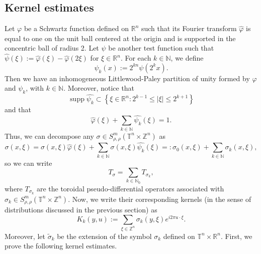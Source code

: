 \documentclass[12pt, reqno]{amsart}
\theoremstyle{definition}
\theoremstyle{remark}
\numberwithin{equation}{section}
\DeclareMathOperator{\supp}{supp}
\begin{document}
\subsection{Kernel estimates}
\label{ssection:kernel}
Let $\varphi$ be a Schwartz function defined on $\mathbb{R}^n$ such that its Fourier transform $\widehat{\varphi}$ is equal to one on the unit ball centered at the origin and is supported in the concentric ball of radius 2. Let $\psi$ be another test function such that $\widehat{\psi}(\xi) := \widehat{\varphi}(\xi) - \widehat{\varphi}(2\xi)$ for $\xi \in \mathbb{R}^n$. For each $k \in \mathbb{N}$, we define
\begin{equation*}
    \psi_k(x):=2^{kn}\psi(2^kx).
\end{equation*}
Then we have an inhomogeneous Littlewood-Paley partition of unity formed by $\varphi$ and $\psi_k$, with $k\in\mathbb{N}$. Moreover, notice that 
\begin{equation*}
    \supp \widehat{\psi_k} \subset \left\{\xi \in \mathbb{R}^n : 2^{k-1} \leq |\xi|\leq 2^{k+1}\right\}
\end{equation*}
and that
\begin{equation*}
    \widehat{\varphi}(\xi) + \sum_{k\in\mathbb{N}} \widehat{\psi_k}(\xi) = 1.
\end{equation*}
Thus, we can decompose any $\sigma \in S^m_{\rho,\rho}(\mathbb{T}^n \times \mathbb{Z}^n)$ as 
\begin{equation*}
    \sigma(x,\xi) = \sigma(x,\xi)\widehat{\varphi}(\xi) + \sum_{k\in \mathbb{N}} \sigma(x,\xi)\widehat{\psi_k}(\xi) =: \sigma_0(x,\xi) + \sum_{k\in \mathbb{N}} \sigma_k(x,\xi),
\end{equation*}
so we can write 
\begin{equation*}
    T_\sigma = \sum_{k\in \mathbb{N}_0} T_{\sigma_k},
\end{equation*}
where $T_{\sigma_k}$ are the toroidal pseudo-differential operators associated with $\sigma_k \in S^m_{\rho,\rho}(\mathbb{T}^n \times \mathbb{Z}^n)$. Now, we write their corresponding kernels (in the sense of distributions discussed in the previous section) as
\begin{equation}
    K_k(y, u) := \sum_{\xi \in \mathbb{Z}^n} \sigma_k(y, \xi)e^{i2\pi u \cdot \xi}.
    \label{eq:kernel-Kk}
\end{equation}
Moreover, let $\tilde{\sigma}_k$ be the extension of the symbol $\sigma_k$ defined on $\mathbb{T}^n \times \mathbb{R}^n$. First, we prove the following kernel estimates.
\end{document}
